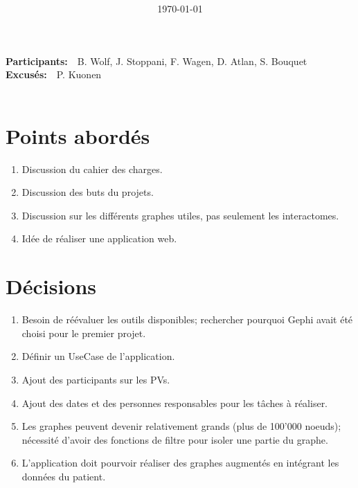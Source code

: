 \documentclass{article}
\title{
\vspace{2in}
\textmd{\textbf{\hmwkTitle}}\\
\vspace{3in}
}
\author{\textbf{\hmwkAuthorName}}
\date{\today} %
\newcommand{\hmwkAuthorName}{S. Bouquet} %
\newcommand{\hLine}{\noindent\makebox[\linewidth]{\rule{\textwidth}{.1pt}} \\}
\begin{document}
\maketitle



 \newpage


\large\textbf{Participants:}\normalsize~~B. Wolf, J. Stoppani, F. Wagen, D. Atlan, \hmwkAuthorName\\
\large\textbf{Excusés:}\normalsize~~P. Kuonen\\
\hLine

\section{Points abordés}
\begin{enumerate}
  \item Discussion du cahier des charges.
  \item Discussion des buts du projets.
  \item Discussion sur les différents graphes utiles, pas seulement les interactomes.
  \item Idée de réaliser une application web.
\end{enumerate}

\section{Décisions}
\begin{enumerate}
  \item Besoin de réévaluer les outils disponibles; rechercher pourquoi Gephi avait été choisi pour le premier projet.
  \item Définir un UseCase de l'application.
  \item Ajout des participants sur les PVs.
  \item Ajout des dates et des personnes responsables pour les tâches à réaliser.
  \item Les graphes peuvent devenir relativement grands (plus de 100'000 noeuds); nécessité d'avoir des fonctions de filtre pour isoler une partie du graphe.
  \item L'application doit pourvoir réaliser des graphes augmentés en intégrant les données du patient.
\end{enumerate}
\end{document}

